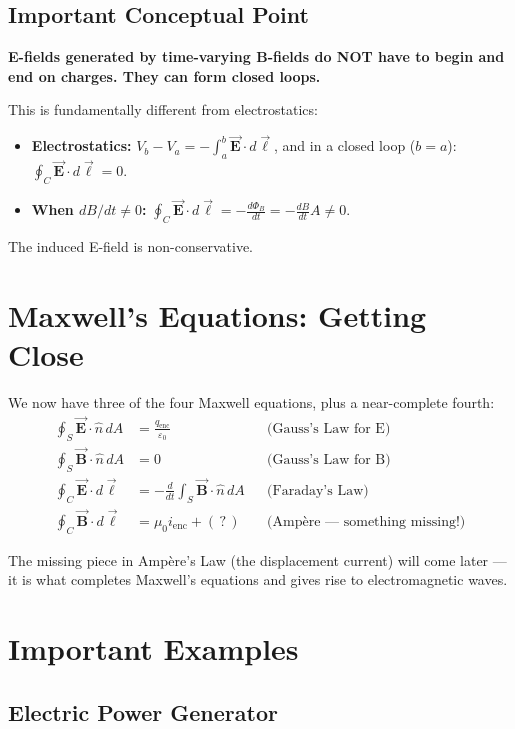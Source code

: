 \documentclass[11pt]{report}
\newcommand{\vbf}[1]{\vec{\mathbf{#1}}}
\newcommand{\nhat}{\hat{n}}
\begin{document}
\subsection*{Important Conceptual Point}

\textbf{E-fields generated by time-varying B-fields do NOT have to begin and end on charges. They can form closed loops.}

This is fundamentally different from electrostatics:
\begin{itemize}
    \item \textbf{Electrostatics:} $V_b - V_a = -\int_a^b \vbf{E} \cdot d\vbf{\ell}$, and in a closed loop ($b = a$): $\oint_C \vbf{E} \cdot d\vbf{\ell} = 0$.
    \item \textbf{When $dB/dt \neq 0$:} $\oint_C \vbf{E} \cdot d\vbf{\ell} = -\frac{d\Phi_B}{dt} = -\frac{dB}{dt} A \neq 0$.
\end{itemize}

The induced E-field is non-conservative.

\section{Maxwell's Equations: Getting Close}

We now have three of the four Maxwell equations, plus a near-complete fourth:
\begin{align}
\oint_S \vbf{E} \cdot \nhat \, dA &= \frac{q_{\text{enc}}}{\varepsilon_0} && \text{(Gauss's Law for E)}\\
\oint_S \vbf{B} \cdot \nhat \, dA &= 0 && \text{(Gauss's Law for B)}\\
\oint_C \vbf{E} \cdot d\vbf{\ell} &= -\frac{d}{dt}\int_S \vbf{B} \cdot \nhat \, dA && \text{(Faraday's Law)}\\
\oint_C \vbf{B} \cdot d\vbf{\ell} &= \mu_0 i_{\text{enc}} + (\,?\,) && \text{(Amp\`ere --- something missing!)}
\end{align}

The missing piece in Amp\`ere's Law (the displacement current) will come later --- it is what completes Maxwell's equations and gives rise to electromagnetic waves.

\section{Important Examples}

\subsection{Electric Power Generator}
\end{document}
